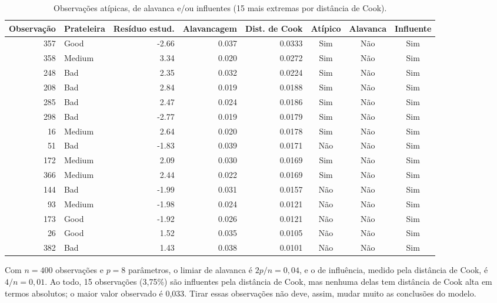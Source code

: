 \documentclass[a4paper]{modeloUFCG} %
\begin{document}
\begin{table}

\caption{\label{tab:influentes}Observações atípicas, de alavanca e/ou influentes (15 mais extremas por distância de Cook).}
\centering
\begin{tabular}[t]{r|l|r|r|r|c|c|c}
\hline
Observação & Prateleira & Resíduo estud. & Alavancagem & Dist. de Cook & Atípico & Alavanca & Influente\\
\hline
357 & Good & -2.66 & 0.037 & 0.0333 & Sim & Não & Sim\\
\hline
358 & Medium & 3.34 & 0.020 & 0.0272 & Sim & Não & Sim\\
\hline
248 & Bad & 2.35 & 0.032 & 0.0224 & Sim & Não & Sim\\
\hline
208 & Bad & 2.84 & 0.019 & 0.0188 & Sim & Não & Sim\\
\hline
285 & Bad & 2.47 & 0.024 & 0.0186 & Sim & Não & Sim\\
\hline
298 & Bad & -2.77 & 0.019 & 0.0179 & Sim & Não & Sim\\
\hline
16 & Medium & 2.64 & 0.020 & 0.0178 & Sim & Não & Sim\\
\hline
51 & Bad & -1.83 & 0.039 & 0.0171 & Não & Não & Sim\\
\hline
172 & Medium & 2.09 & 0.030 & 0.0169 & Sim & Não & Sim\\
\hline
366 & Medium & 2.44 & 0.022 & 0.0169 & Sim & Não & Sim\\
\hline
144 & Bad & -1.99 & 0.031 & 0.0157 & Não & Não & Sim\\
\hline
93 & Medium & -1.98 & 0.024 & 0.0121 & Não & Não & Sim\\
\hline
173 & Good & -1.92 & 0.026 & 0.0121 & Não & Não & Sim\\
\hline
26 & Good & 1.52 & 0.035 & 0.0105 & Não & Não & Sim\\
\hline
382 & Bad & 1.43 & 0.038 & 0.0101 & Não & Não & Sim\\
\hline
\end{tabular}
\end{table}

Com \(n = 400\) observações e \(p = 8\) parâmetros, o limiar de alavanca é \(2p/n = 0{,}04\), e o de influência, medido pela distância de Cook, é \(4/n = 0{,}01\). Ao todo, 15 observações (3,75\%) são influentes pela distância de Cook, mas nenhuma delas tem distância de Cook alta em termos absolutos; o maior valor observado é 0,033. Tirar essas observações não deve, assim, mudar muito as conclusões do modelo.
\end{document}
